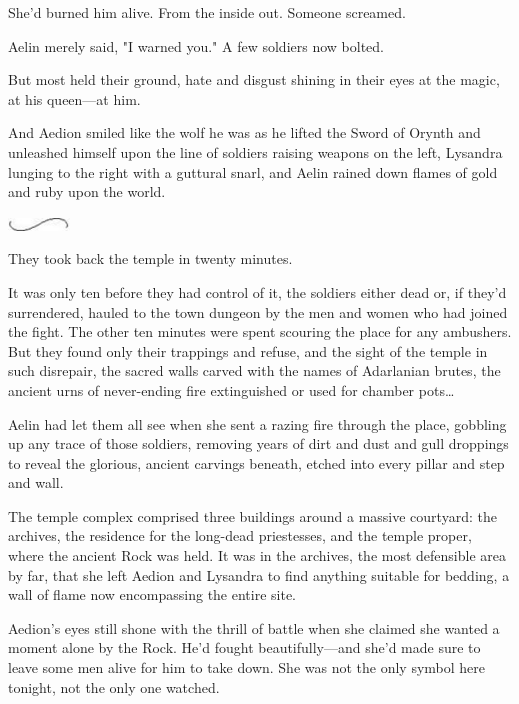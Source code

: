 She'd burned him alive.
From the inside out.
Someone screamed.

Aelin merely said, "I warned you."
A few soldiers now bolted.

But most held their ground, hate and disgust shining in their eyes at the magic, at his queen---at him.

And Aedion smiled like the wolf he was as he lifted the Sword of Orynth and unleashed himself upon the line of soldiers raising weapons on the left, Lysandra lunging to the right with a guttural snarl, and Aelin rained down flames of gold and ruby upon the world.

\begin{center}
	\includegraphics[width=0.65in,height=0.13in]{images/seperator}
\end{center}

They took back the temple in twenty minutes.

It was only ten before they had control of it, the soldiers either dead or, if they'd surrendered, hauled to the town dungeon by the men and women who had joined the fight.
The other ten minutes were spent scouring the place for any ambushers.
But they found only their trappings and refuse, and the sight of the temple in such disrepair, the sacred walls carved with the names of Adarlanian brutes, the ancient urns of never-ending fire extinguished or used for chamber pots\ldots{}

Aelin had let them all see when she sent a razing fire through the place, gobbling up any trace of those soldiers, removing years of dirt and dust and gull droppings to reveal the glorious, ancient carvings beneath, etched into every pillar and step and wall.

The temple complex comprised three buildings around a massive courtyard:
the archives, the residence for the long-dead priestesses, and the temple proper, where the ancient Rock was held.
It was in the archives, the most defensible area by far, that she left Aedion and Lysandra to find anything suitable for bedding, a wall of flame now encompassing the entire site.

Aedion's eyes still shone with the thrill of battle when she claimed she wanted a moment alone by the Rock.
He'd fought beautifully---and she'd made sure to leave some men alive for him to take down.
She was not the only symbol here tonight, not the only one watched.

